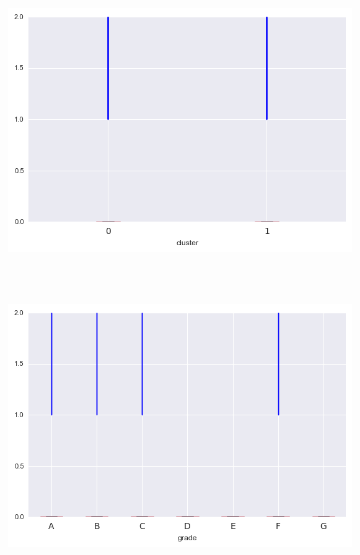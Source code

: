 \begin{anexosenv}
\begin{figure}[t!]
\begin{subfigure}[t]{0.5\textwidth}
            \centerline{\includegraphics[width=1.05\textwidth]{img/pub_rec_by_cluster}}
        \end{subfigure}%
        ~ 
        \begin{subfigure}[t]{0.5\textwidth}
            \centering
   
            \centerline{\includegraphics[width=1.05\textwidth]{img/pub_rec_by_grade}}

        \end{subfigure}
\\
                \caption{inq\textunderscore last\textunderscore 6mths}
        \begin{subfigure}[t]{0.5\textwidth}
            \centering


\end{subfigure}
\end{figure}
\end{anexosenv}
